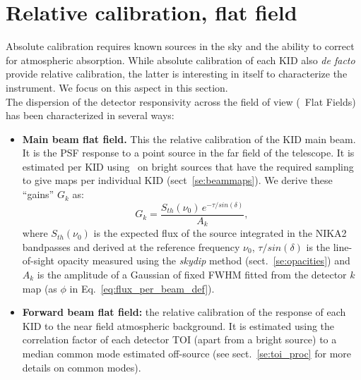 

\section{Relative calibration, flat field}%
\label{se:flatfields}

Absolute calibration requires known sources in the sky and the ability to
correct for atmospheric absorption. While absolute calibration of each KID also
\emph{de facto} provide relative calibration, the latter is interesting in
itself to characterize the instrument. We focus on this aspect in this section.\\

The dispersion of the detector responsivity across the field of view (\aka\ Flat
Fields) has been characterized in several ways:

\begin{itemize}
\item {\bf Main beam flat field.} This the relative calibration of the KID main
  beam. It is the PSF response to a point source in the far field of the
  telescope. It is estimated per KID using \bms\ on bright sources that have the
  required sampling to give maps per individual KID (sect~\ref{se:beammaps}). We
  derive these ``gains'' $G_k$ as:
  \begin{equation}
    G_k = \frac{S_{th}(\nu_0)\, e^{-\tau/sin(\delta)}}{A_k}, 
  \end{equation}
  where $S_{th}(\nu_0)$ is the expected flux of the source integrated in the
  NIKA2 bandpasses and derived at the reference frequency $\nu_0$, 
  $\tau/sin(\delta)$ is the line-of-sight opacity measured using the
  \emph{skydip} method (sect.~\ref{se:opacities}) and $A_k$ is the
  amplitude of a Gaussian of fixed FWHM fitted from the detector $k$ map (as
  $\phi$ in Eq.~\ref{eq:flux_per_beam_def}).
\item {\bf Forward beam flat field:} the relative calibration of the response of
  each KID to the near field atmospheric background. It is estimated
  using the correlation factor of each detector TOI (apart from a bright source)
  to a median common mode estimated off-source (see sect.~\ref{se:toi_proc} for
  more details on common modes).
\end{itemize}

